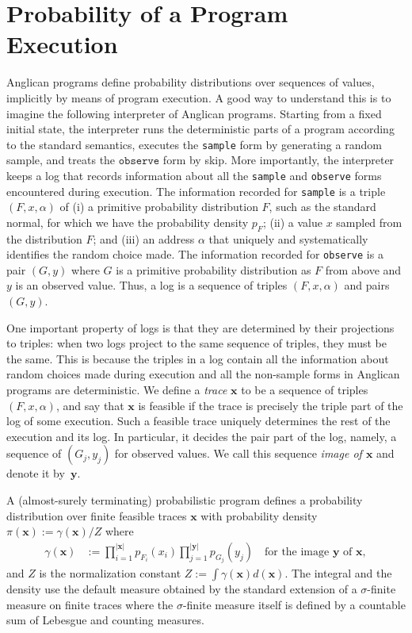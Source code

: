\documentclass[sigconf]{acmart}
\begin{document}
\section{Probability of a Program Execution}
\label{sec:pp-def}

Anglican programs define probability distributions 
over sequences of values, implicitly by means of program execution.
A good way to understand this is to imagine the following 
interpreter of Anglican programs. Starting from a fixed initial state,
the interpreter runs the deterministic parts of a program 
according to the standard semantics, executes the \texttt{sample} form by
generating a random sample, and treats the $\texttt{observe}$ form by skip.
More importantly, the interpreter keeps a log that records
information about all the \texttt{sample} and \texttt{observe} forms encountered 
during execution. The information recorded for \texttt{sample} is 
a triple $(F,x,\alpha)$ of (i) a primitive probability distribution $F$, 
such as the standard normal, for which we have 
the probability density $p_F$; (ii) a value $x$ sampled from the distribution $F$; 
and (iii) an address $\alpha$ that uniquely and systematically identifies the random 
choice made. The information recorded for \texttt{observe} is a pair $(G,y)$ where $G$
is a primitive probability distribution as $F$ from above and $y$ is an 
observed value. Thus, a log is a sequence of triples $(F,x,\alpha)$ and 
pairs $(G,y)$.

One important property of logs is that they are determined by 
their projections to triples: when two logs project to the same
sequence of triples, they must be the same. This is because
the triples in a log contain all the information about random choices
made during execution and all the non-sample forms in Anglican programs
are deterministic. We define a \textit{trace} $\pmb{x}$ to be a sequence
of triples $(F,x,\alpha)$, and say that $\pmb{x}$ is feasible if
the trace is precisely the triple part of the log of some execution. 
Such a feasible trace uniquely determines the rest of the execution and its log.
In particular, it decides the pair part of the log, namely, 
a sequence of $(G_j, y_j)$ for observed values. We call this sequence \textit{image of $\pmb{x}$} 
and denote it by~$\pmb{y}$. 

A (almost-surely terminating) probabilistic program defines a probability distribution 
over finite feasible traces $\pmb{x}$ with probability density 
$\pi(\pmb{x}) := \gamma(\pmb{x}) / Z$ where 
\begin{align}
  \gamma(\pmb{x}) 
  &:= 
  \prod_{i=1}^{\left|\pmb{x}\right|}
  p_{F_i}(x_i) \prod_{j=1}^{\left|\pmb{y}\right|}p_{G_j}(y_{j})
  \quad \mbox{for the image $\pmb{y}$ of $\pmb{x}$}, 
  \label{eqn:p-trace}
\end{align}
and $Z$ is the normalization constant $Z := \int \gamma(\pmb{x})d(\pmb{x})$. The integral and the density use the default measure obtained by the standard extension of
a $\sigma$-finite measure on finite traces where the $\sigma$-finite measure itself is defined by
a countable sum of Lebesgue and counting measures.
\end{document}
